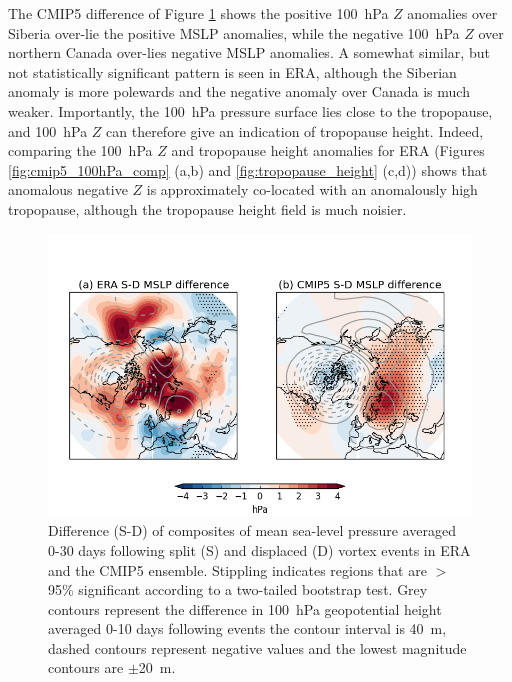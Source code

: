 The CMIP5 difference of Figure \ref{fig:cmip5_mslp_diff} shows the positive
100~hPa $Z$ anomalies over Siberia over-lie the positive MSLP anomalies, while
the negative 100~hPa $Z$ over northern Canada over-lies negative MSLP
anomalies. A somewhat similar, but not statistically significant pattern is seen
in ERA, although the Siberian anomaly is more polewards and the negative anomaly
over Canada is much weaker. Importantly, the 100~hPa pressure surface lies
close to the tropopause, and 100~hPa $Z$ can therefore give an indication of
tropopause height. Indeed, comparing the 100~hPa $Z$ and tropopause height
anomalies for ERA (Figures \ref{fig:cmip5_100hPa_comp} (a,b) and
\ref{fig:tropopause_height} (c,d)) shows that anomalous negative $Z$ is
approximately co-located with an anomalously high tropopause, although the
tropopause height field is much noisier. 



\begin{figure}
 \centering
 \noindent\includegraphics[width=\textwidth]{figures/chapter-models/mslp_diff.png}
 \caption[Difference of MSLP following split and displaced vortex
 events.]{Difference (S-D) of composites of mean sea-level pressure averaged
   0-30 days following split (S) and displaced (D) vortex events in ERA and the
   CMIP5 ensemble. Stippling indicates regions that are $>$95\% significant
   according to a two-tailed bootstrap test. Grey contours represent the
   difference in 100~hPa geopotential height averaged 0-10 days following events
   the contour interval is 40~m, dashed contours represent negative values and
   the lowest magnitude contours are $\pm$20~m. }
 \label{fig:cmip5_mslp_diff}
\end{figure}





